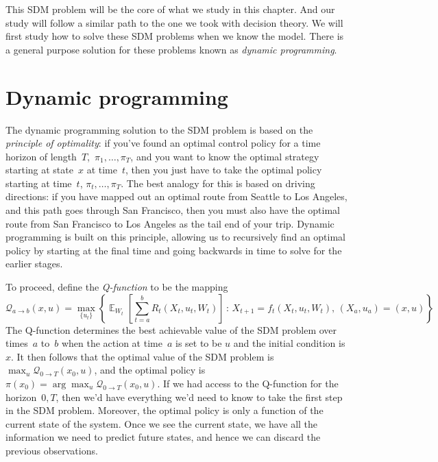 \documentclass{tufte-book}
\begin{document}
This SDM problem will be the core of what we study in this chapter. And
our study will follow a similar path to the one we took with decision
theory. We will first study how to solve these SDM problems when we know
the model. There is a general purpose solution for these problems known
as \emph{dynamic programming}.

\hypertarget{dynamic-programming}{%
\section{Dynamic programming}\label{dynamic-programming}}

The dynamic programming solution to the SDM problem is based on the
\emph{principle of optimality}: if you've found an optimal control
policy for a time horizon of length~\(T\),~\(\pi_1,\ldots, \pi_T\), and
you want to know the optimal strategy starting at state~\(x\) at
time~\(t\), then you just have to take the optimal policy starting at
time~\(t\), \(\pi_t,\ldots,\pi_T\). The best analogy for this is based
on driving directions: if you have mapped out an optimal route from
Seattle to Los Angeles, and this path goes through San Francisco, then
you must also have the optimal route from San Francisco to Los Angeles
as the tail end of your trip. Dynamic programming is built on this
principle, allowing us to recursively find an optimal policy by starting
at the final time and going backwards in time to solve for the earlier
stages.

To proceed, define the \emph{Q-function} to be the
mapping \[
    \mathcal{Q}_{a\rightarrow b}(x,u) = \max_{\{u_t\}}\left\{ \mathop\mathbb{E}_{W_t}\left[ \sum_{t=a}^b R_t(X_t,u_t,W_t)\right] \,:\,X_{t+1} = f_t(X_t, u_t, W_t),\,(X_a,u_a)=(x,u)\right\}
\] The Q-function determines the best achievable value of the SDM
problem over times~\(a\) to~\(b\) when the action at time~\(a\) is set
to be \(u\) and the initial condition is~\(x\). It then follows that the
optimal value of the SDM problem is
\(\max_u \mathcal{Q}_{0\rightarrow T}(x_0,u)\), and the optimal policy
is \(\pi(x_0) = \arg \max_u \mathcal{Q}_{0\rightarrow T}(x_0,u)\). If we
had access to the Q-function for the horizon~\({0,T}\), then we'd have
everything we'd need to know to take the first step in the SDM problem.
Moreover, the optimal policy is only a function of the current state of
the system. Once we see the current state, we have all the information
we need to predict future states, and hence we can discard the previous
observations.
\end{document}
